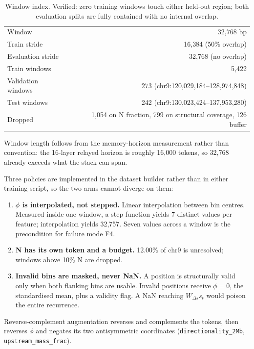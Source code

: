 \documentclass[11pt,a4paper]{article}
\newcommand{\code}[1]{\texttt{\small #1}}
\begin{document}
\begin{table}[h]\centering
\begin{tabular}{@{}lr@{}}
\toprule
Window & 32{,}768 bp \\
Train stride & 16{,}384 (50\% overlap) \\
Evaluation stride & 32{,}768 (no overlap) \\
Train windows & 5{,}422 \\
Validation windows & 273 \quad (chr9:120{,}029{,}184--128{,}974{,}848) \\
Test windows & 242 \quad (chr9:130{,}023{,}424--137{,}953{,}280) \\
Dropped & 1{,}054 on N fraction, 799 on structural coverage, 126 buffer \\
\bottomrule
\end{tabular}
\caption{Window index. Verified: zero training windows touch either held-out
region; both evaluation splits are fully contained with no internal overlap.}
\end{table}

Window length follows from the memory-horizon measurement rather than
convention: the 16-layer relayed horizon is roughly 16{,}000 tokens, so 32{,}768
already exceeds what the stack can span.

Three policies are implemented in the dataset builder rather than in either
training script, so the two arms cannot diverge on them:

\begin{enumerate}[label=(\roman*)]
\item \textbf{$\phi$ is interpolated, not stepped.} Linear interpolation between
bin centres. Measured inside one window, a step function yields 7 distinct values
per feature; interpolation yields 32{,}757. Seven values across a window is the
precondition for failure mode F4.
\item \textbf{N has its own token and a budget.} 12.00\% of chr9 is unresolved;
windows above 10\% N are dropped.
\item \textbf{Invalid bins are masked, never NaN.} A position is structurally
valid only when both flanking bins are usable. Invalid positions receive
$\phi=0$, the standardised mean, plus a validity flag. A NaN reaching
$W_{\Delta s}s_t$ would poison the entire recurrence.
\end{enumerate}

Reverse-complement augmentation reverses and complements the tokens, then
reverses $\phi$ and negates its two antisymmetric coordinates
(\code{directionality\_2Mb}, \code{upstream\_mass\_frac}).
\end{document}
